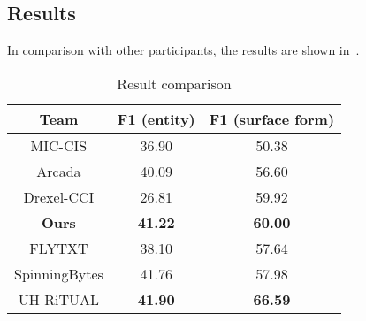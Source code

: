 \subsection{Results} 
In comparison with other participants, the results are shown in~.

\begin{table}[th]
	\small
	\centering
	\caption{Result comparison}
	\label{tbl:compare}
	\begin{tabular}{|c|c|c|}
		\hline
		\textbf{Team}                & \textbf{F1 (entity) }   & \textbf{F1 (surface form)} \\ \hline
		MIC-CIS             & 36.90          & 50.38             \\ \hline
		Arcada              & 40.09          & 56.60             \\ \hline
		Drexel-CCI          & 26.81          & 59.92             \\ \hline
		\textbf{Ours} & \textbf{41.22} & \textbf{60.00}    \\ \hline
		FLYTXT              & 38.10          & 57.64             \\ \hline
		SpinningBytes       & 41.76          & 57.98             \\ \hline
		UH-RiTUAL           & \textbf{41.90   }       & \textbf{66.59 }            \\ \hline
	\end{tabular}
\end{table}

